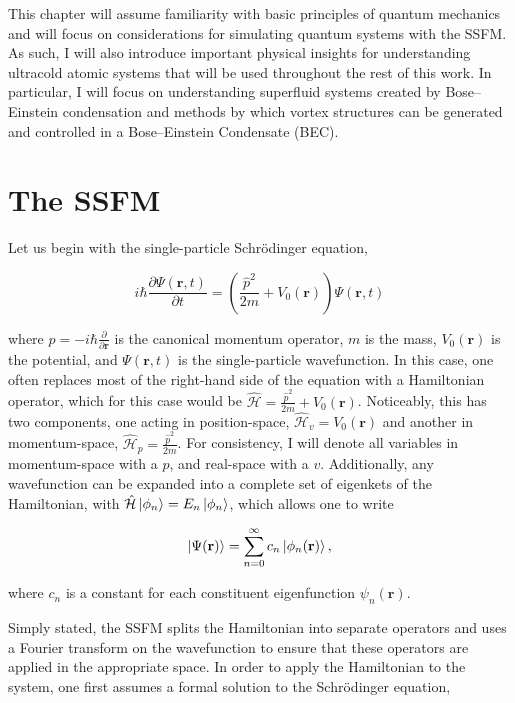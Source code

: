 This chapter will assume familiarity with basic principles of quantum mechanics and will focus on considerations for simulating quantum systems with the SSFM.
As such, I will also introduce important physical insights for understanding ultracold atomic systems that will be used throughout the rest of this work.
In particular, I will focus on understanding superfluid systems created by Bose--Einstein condensation and methods by which vortex structures can be generated and controlled in a Bose--Einstein Condensate (BEC).


\section{The SSFM}
Let us begin with the single-particle Schr\"odinger equation,

\begin{equation}
i\hbar \frac{\partial \Psi(\mathbf{r}, t)}{\partial t} = \left(\frac{\hat p^2}{2m} + V_0(\mathbf{r}) \right)\Psi(\mathbf{r},t)
\label{eqn:schrody}
\end{equation}

\noindent where $\hat p = -i\hbar\frac{\partial}{\partial \mathbf{r}}$ is the canonical momentum operator, $m$ is the mass, $V_0(\mathbf{r})$ is the potential, and $\Psi(\mathbf{r},t)$ is the single-particle wavefunction.
In this case, one often replaces most of the right-hand side of the equation with a Hamiltonian operator, which for this case would be $\mathcal{\hat H} = \frac{\hat p^2}{2m} + V_0(\mathbf{r})$.
Noticeably, this has two components, one acting in position-space, $\mathcal{\hat H}_v = V_0(\mathbf{r})$ and another in momentum-space, $\mathcal{\hat H}_p = \frac{\hat p^2}{2m}$.
For consistency, I will denote all variables in momentum-space with a $p$, and real-space with a $v$.
Additionally, any wavefunction can be expanded into a complete set of eigenkets of the Hamiltonian, with $\mathcal{\hat H}\ket{\phi_n} = E_n\ket{\phi_n}$,
which allows one to write

\begin{equation}
\ket{\Psi(\mathbf{r})} = \sum_{n=0}^\infty c_n \ket{\phi_n(\mathbf{r})},
\end{equation}

\noindent where $c_n$ is a constant for each constituent eigenfunction $\psi_n(\mathbf{r})$.

Simply stated, the SSFM splits the Hamiltonian into separate operators and uses a Fourier transform on the wavefunction to ensure that these operators are applied in the appropriate space.
In order to apply the Hamiltonian to the system, one first assumes a formal solution to the Schr\"odinger equation,


